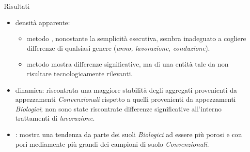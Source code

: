 \documentclass[10pt]{beamer}
\begin{document}



\begin{frame}[label=finale]{Risultati}
  \begin{itemize}[<+->]

  \item densità apparente:
    \begin{itemize}
    \item metodo \hyperlink{Core}{}, nonostante la semplicità esecutiva,
      sembra inadeguato a cogliere differenze di qualsiasi genere
      (\emph{anno, lavorazione, conduzione}).
    \item metodo \hyperlink{Clod}{} mostra differenze significative, ma di
      una entità tale da non risultare tecnologicamente rilevanti.
    \end{itemize}
  \item \hyperlink{distribuzione}{} dinamica: riscontrata una
    maggiore stabilità degli aggregati provenienti da appezzamenti
    \emph{Convenzionali} rispetto a quelli provenienti da appezzamenti
    \emph{Biologici}; non sono state riscontrate differenze significative
    all'interno trattamenti di \emph{lavorazione}.
  \item \hyperlink{Porosimetria}{}: mostra una tendenza da parte dei suoli
    \emph{Biologici} ad essere più porosi e con pori mediamente più
    grandi dei campioni di suolo \emph{Convenzionali}.
  \end{itemize}

\end{frame}
\end{document}

